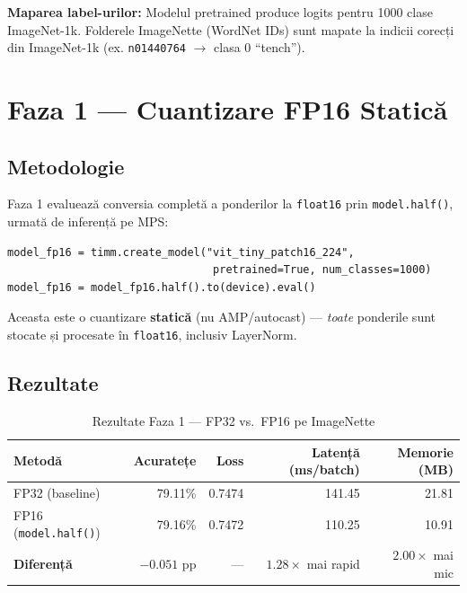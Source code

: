 \documentclass[12pt,a4paper]{article}
\begin{document}
\textbf{Maparea label-urilor:} Modelul pretrained produce logits pentru 1000 clase
ImageNet-1k. Folderele ImageNette (WordNet IDs) sunt mapate la indicii corecți din
ImageNet-1k (ex. \texttt{n01440764} $\to$ clasa 0 ``tench'').

\section{Faza 1 — Cuantizare FP16 Statică}

\subsection{Metodologie}

Faza 1 evaluează conversia completă a ponderilor la \texttt{float16} prin
\texttt{model.half()}, urmată de inferență pe MPS:

\begin{verbatim}
model_fp16 = timm.create_model("vit_tiny_patch16_224",
                                pretrained=True, num_classes=1000)
model_fp16 = model_fp16.half().to(device).eval()
\end{verbatim}

Aceasta este o cuantizare \textbf{statică} (nu AMP/autocast) --- \emph{toate}
ponderile sunt stocate și procesate în \texttt{float16}, inclusiv LayerNorm.

\subsection{Rezultate}

\begin{table}[H]
  \centering
  \caption{Rezultate Faza 1 --- FP32 vs.\ FP16 pe ImageNette}
  \begin{tabular}{lrrrr}
    \toprule
    \textbf{Metodă} & \textbf{Acuratețe} & \textbf{Loss} &
    \textbf{Latență (ms/batch)} & \textbf{Memorie (MB)} \\
    \midrule
    FP32 (baseline) & 79.11\% & 0.7474 & 141.45 & 21.81 \\
    FP16 (\texttt{model.half()}) & 79.16\% & 0.7472 & 110.25 & 10.91 \\
    \midrule
    \textbf{Diferență} & $-0.051$ pp & --- & $\mathbf{1.28\times}$ mai rapid &
    $\mathbf{2.00\times}$ mai mic \\
    \bottomrule
  \end{tabular}
  \label{tab:fp16_results}
\end{table}
\end{document}
